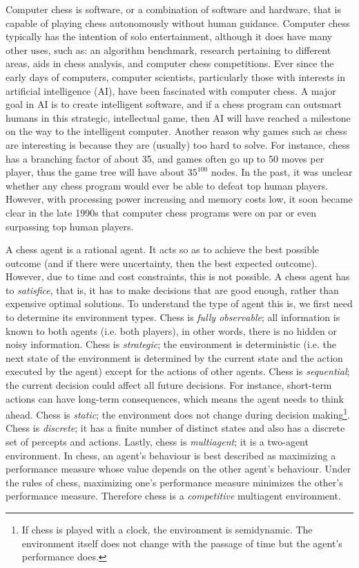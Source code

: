 \documentclass[11pt,letterpaper,twocolumn]{article}
\begin{document}
Computer chess is software, or a combination of software and hardware, that is capable of playing chess autonomously without human guidance. Computer chess typically has the
intention of solo entertainment, although it does have many other uses, such as: an algorithm benchmark, research pertaining to different areas, aids in chess analysis, and computer chess competitions.
Ever since the early days of computers, computer scientists, particularly those with interests in artificial intelligence (AI), have been fascinated with computer chess.
A major goal in AI is to create intelligent software, and if a chess program can outsmart humans in this strategic, intellectual game, then AI will have reached a
milestone on the way to the intelligent computer. Another reason why games such as chess are interesting is because they are (usually) too hard to solve.
For instance, chess has a branching factor of about 35, and games often go up to 50 moves per player, thus the game tree will have about $35^{100}$ nodes.
In the past, it was unclear whether any chess program would ever be able to defeat top human players. However, with processing power increasing and memory costs low,
it soon became clear in the late 1990s that computer chess programs were on par or even surpassing top human players.

A chess agent is a rational agent. It acts so as to achieve the best possible outcome (and if there were uncertainty, then the best expected outcome). However, due to
time and cost constraints, this is not possible. A chess agent has to \emph{satisfice}, that is, it has to make decisions that are good enough, rather than expensive
optimal solutions. To understand the type of agent this is, we first need to determine its environment types. Chess is \emph{fully observable}; all information
is known to both agents (i.e. both players), in other words, there is no hidden or noisy information. Chess is \emph{strategic}; the environment is deterministic (i.e. 
the next state of the environment is determined by the current state and the action executed by the agent) except for the actions of other agents. Chess is \emph{sequential};
the current decision could affect all future decisions. For instance, short-term actions can have long-term consequences, which means the agent needs to think ahead.
Chess is \emph{static}; the environment does not change during decision making\footnote{If chess is played with a clock, the environment is semidynamic. The environment
itself does not change with the passage of time but the agent's performance does.}. Chess is \emph{discrete}; it has a finite number of distinct states and also has a 
discrete set of percepts and actions. Lastly, chess is \emph{multiagent}; it is a two-agent environment. In chess, an agent's behaviour is best described as maximizing
a performance measure whose value depends on the other agent's behaviour. Under the rules of chess, maximizing one's performance measure minimizes the other's performance
measure. Therefore chess is a \emph{competitive} multiagent environment.
\end{document}
